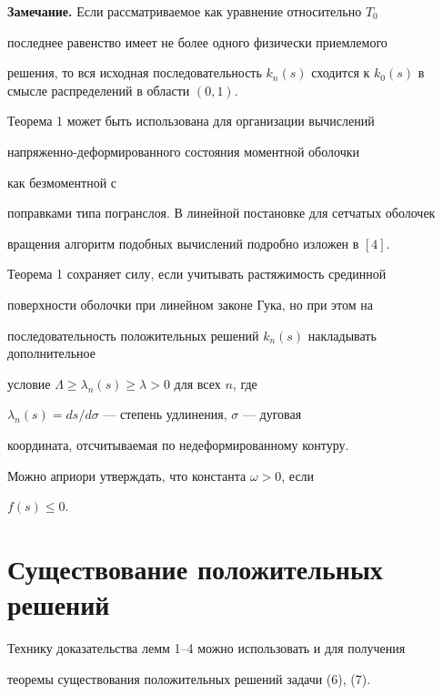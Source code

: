 {\bf Замечание.} Если рассматриваемое как уравнение относительно $T_0$


последнее равенство имеет не более одного физически приемлемого


решения, то вся исходная последовательность $k_n(s)$ сходится к $k_0(s)


$ в смысле распределений в области $(0,1)$.


\medskip





Теорема 1 может быть использована для организации вычислений


напряженно-де\-фор\-ми\-ро\-ван\-ного состояния моментной оболочки


как безмоментной с


поправками типа погранслоя. В линейной постановке для сетчатых оболочек


вращения алгоритм подобных вычислений подробно изложен в $[4]$.





Теорема 1 сохраняет силу, если учитывать растяжимость срединной


поверхности оболочки при линейном законе Гука, но при этом на


последовательность положительных решений $k_n(s)$ накладывать дополнительное


условие $\Lambda \ge \lambda_n(s) \ge \lambda >0$ для всех $n$, где


$\lambda_n(s)=ds/d\sigma $ --- степень удлинения, $\sigma $ --- дуговая


координата, отсчитываемая по недеформированному контуру.





Можно априори утверждать, что константа $\omega >0$, если


$f(s) \le 0$.





\section{Существование положительных решений}





Технику доказательства лемм 1--4 можно использовать и для получения


теоремы существования положительных решений задачи (6), (7).





